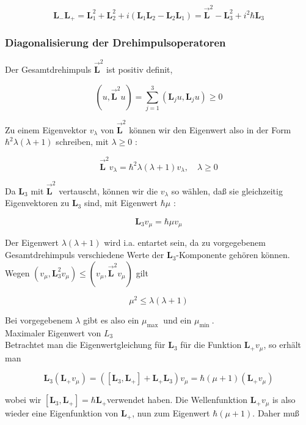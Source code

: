 \documentclass[10pt, letterpaper]{article}
\begin{document}
$$
\mathbf{L}_{-} \mathbf{L}_{+}=\mathbf{L}_{1}^{2}+\mathbf{L}_{2}^{2}+i\left(\mathbf{L}_{1} \mathbf{L}_{2}-\mathbf{L}_{2} \mathbf{L}_{1}\right)=\overrightarrow{\mathbf{L}}^{2}-\mathbf{L}_{3}^{2}+i^{2} \hbar \mathbf{L}_{3}
$$

\subsubsection*{Diagonalisierung der Drehimpulsoperatoren}
Der Gesamtdrehimpuls $\overrightarrow{\mathbf{L}}^{2}$ ist positiv definit,

$$
\left(u, \overrightarrow{\mathbf{L}}^{2} u\right)=\sum_{j=1}^{3}\left(\mathbf{L}_{j} u, \mathbf{L}_{j} u\right) \geq 0
$$

Zu einem Eigenvektor $v_{\lambda}$ von $\overrightarrow{\mathbf{L}}^{2}$ können wir den Eigenwert also in der Form $\hbar^{2} \lambda(\lambda+1)$ schreiben, mit $\lambda \geq 0$ :

$$
\overrightarrow{\mathbf{L}}^{2} v_{\lambda}=\hbar^{2} \lambda(\lambda+1) v_{\lambda}, \quad \lambda \geq 0
$$

Da $\mathbf{L}_{3}$ mit $\overrightarrow{\mathbf{L}}^{2}$ vertauscht, können wir die $v_{\lambda}$ so wählen, daß sie gleichzeitig Eigenvektoren zu $\mathbf{L}_{3}$ sind, mit Eigenwert $\hbar \mu$ :

$$
\mathbf{L}_{3} v_{\mu}=\hbar \mu v_{\mu}
$$

Der Eigenwert $\lambda(\lambda+1)$ wird i.a. entartet sein, da zu vorgegebenem Gesamtdrehimpuls verschiedene Werte der $\mathbf{L}_{3}$-Komponente gehören können.\\
Wegen $\left(v_{\mu}, \mathbf{L}_{3}^{2} v_{\mu}\right) \leq\left(v_{\mu}, \overrightarrow{\mathbf{L}}^{2} v_{\mu}\right)$ gilt

$$
\mu^{2} \leq \lambda(\lambda+1)
$$

Bei vorgegebenem $\lambda$ gibt es also ein $\mu_{\text {max }}$ und ein $\mu_{\text {min }}$.\\
Maximaler Eigenwert von $L_{3}$\\
Betrachtet man die Eigenwertgleichung für $\mathbf{L}_{3}$ für die Funktion $\mathbf{L}_{+} v_{\mu}$, so erhält man

$$
\mathbf{L}_{3}\left(\mathbf{L}_{+} v_{\mu}\right)=\left(\left[\mathbf{L}_{3}, \mathbf{L}_{+}\right]+\mathbf{L}_{+} \mathbf{L}_{3}\right) v_{\mu}=\hbar(\mu+1)\left(\mathbf{L}_{+} v_{\mu}\right)
$$

wobei wir $\left[\mathbf{L}_{3}, \mathbf{L}_{+}\right]=\hbar \mathbf{L}_{+}$verwendet haben. Die Wellenfunktion $\mathbf{L}_{+} v_{\mu}$ is also wieder eine Eigenfunktion von $\mathbf{L}_{+}$, nun zum Eigenwert $\hbar(\mu+1)$. Daher muß
\end{document}
